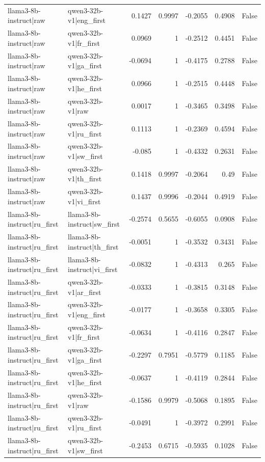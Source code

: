 \begin{table}
\begin{tabular}{l l r r r r l}
llama3-8b-instruct|raw & qwen3-32b-v1|eng_first & 0.1427 & 0.9997 & -0.2055 & 0.4908 & False \\
llama3-8b-instruct|raw & qwen3-32b-v1|fr_first & 0.0969 & 1 & -0.2512 & 0.4451 & False \\
llama3-8b-instruct|raw & qwen3-32b-v1|ga_first & -0.0694 & 1 & -0.4175 & 0.2788 & False \\
llama3-8b-instruct|raw & qwen3-32b-v1|he_first & 0.0966 & 1 & -0.2515 & 0.4448 & False \\
llama3-8b-instruct|raw & qwen3-32b-v1|raw & 0.0017 & 1 & -0.3465 & 0.3498 & False \\
llama3-8b-instruct|raw & qwen3-32b-v1|ru_first & 0.1113 & 1 & -0.2369 & 0.4594 & False \\
llama3-8b-instruct|raw & qwen3-32b-v1|sw_first & -0.085 & 1 & -0.4332 & 0.2631 & False \\
llama3-8b-instruct|raw & qwen3-32b-v1|th_first & 0.1418 & 0.9997 & -0.2064 & 0.49 & False \\
llama3-8b-instruct|raw & qwen3-32b-v1|vi_first & 0.1437 & 0.9996 & -0.2044 & 0.4919 & False \\
llama3-8b-instruct|ru_first & llama3-8b-instruct|sw_first & -0.2574 & 0.5655 & -0.6055 & 0.0908 & False \\
llama3-8b-instruct|ru_first & llama3-8b-instruct|th_first & -0.0051 & 1 & -0.3532 & 0.3431 & False \\
llama3-8b-instruct|ru_first & llama3-8b-instruct|vi_first & -0.0832 & 1 & -0.4313 & 0.265 & False \\
llama3-8b-instruct|ru_first & qwen3-32b-v1|ar_first & -0.0333 & 1 & -0.3815 & 0.3148 & False \\
llama3-8b-instruct|ru_first & qwen3-32b-v1|eng_first & -0.0177 & 1 & -0.3658 & 0.3305 & False \\
llama3-8b-instruct|ru_first & qwen3-32b-v1|fr_first & -0.0634 & 1 & -0.4116 & 0.2847 & False \\
llama3-8b-instruct|ru_first & qwen3-32b-v1|ga_first & -0.2297 & 0.7951 & -0.5779 & 0.1185 & False \\
llama3-8b-instruct|ru_first & qwen3-32b-v1|he_first & -0.0637 & 1 & -0.4119 & 0.2844 & False \\
llama3-8b-instruct|ru_first & qwen3-32b-v1|raw & -0.1586 & 0.9979 & -0.5068 & 0.1895 & False \\
llama3-8b-instruct|ru_first & qwen3-32b-v1|ru_first & -0.0491 & 1 & -0.3972 & 0.2991 & False \\
llama3-8b-instruct|ru_first & qwen3-32b-v1|sw_first & -0.2453 & 0.6715 & -0.5935 & 0.1028 & False \\

\end{tabular}
\end{table}
